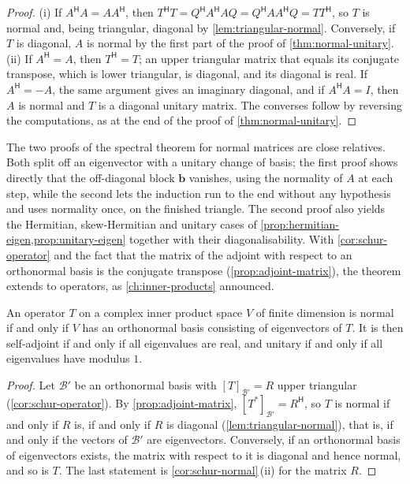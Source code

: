 \begin{proof}
(i) If $A^{\mathsf H}A=AA^{\mathsf H}$, then $T^{\mathsf H}T=Q^{\mathsf H}A^{\mathsf H}AQ=Q^{\mathsf H}AA^{\mathsf H}Q=TT^{\mathsf H}$, so $T$ is normal and, being triangular, diagonal by \cref{lem:triangular-normal}. Conversely, if $T$ is diagonal, $A$ is normal by the first part of the proof of \cref{thm:normal-unitary}. (ii) If $A^{\mathsf H}=A$, then $T^{\mathsf H}=T$; an upper triangular matrix that equals its conjugate transpose, which is lower triangular, is diagonal, and its diagonal is real. If $A^{\mathsf H}=-A$, the same argument gives an imaginary diagonal, and if $A^{\mathsf H}A=I$, then $A$ is normal and $T$ is a diagonal unitary matrix. The converses follow by reversing the computations, as at the end of the proof of \cref{thm:normal-unitary}.
\end{proof}

The two proofs of the spectral theorem for normal matrices are close relatives. Both split off an eigenvector with a unitary change of basis; the first proof shows directly that the off-diagonal block $\mathbf b$ vanishes, using the normality of $A$ at each step, while the second lets the induction run to the end without any hypothesis and uses normality once, on the finished triangle. The second proof also yields the Hermitian, skew-Hermitian and unitary cases of \cref{prop:hermitian-eigen,prop:unitary-eigen} together with their diagonalisability. With \cref{cor:schur-operator} and the fact that the matrix of the adjoint with respect to an orthonormal basis is the conjugate transpose (\cref{prop:adjoint-matrix}), the theorem extends to operators, as \cref{ch:inner-products} announced.

\begin{corollary}
\label{cor:normal-operator}
An operator $T$ on a complex inner product space $V$ of finite dimension is normal if and only if $V$ has an orthonormal basis consisting of eigenvectors of $T$. It is then self-adjoint if and only if all eigenvalues are real, and unitary if and only if all eigenvalues have modulus $1$.
\end{corollary}

\begin{proof}
Let $\mathcal B'$ be an orthonormal basis with $[T]_{\mathcal B'}=R$ upper triangular (\cref{cor:schur-operator}). By \cref{prop:adjoint-matrix}, $[T^*]_{\mathcal B'}=R^{\mathsf H}$, so $T$ is normal if and only if $R$ is, if and only if $R$ is diagonal (\cref{lem:triangular-normal}), that is, if and only if the vectors of $\mathcal B'$ are eigenvectors. Conversely, if an orthonormal basis of eigenvectors exists, the matrix with respect to it is diagonal and hence normal, and so is $T$. The last statement is \cref{cor:schur-normal}\,(ii) for the matrix $R$.
\end{proof}

